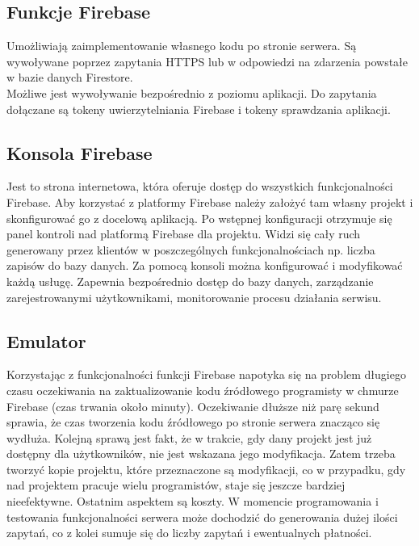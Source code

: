 \subsection{Funkcje Firebase}

Umożliwiają zaimplementowanie własnego kodu po stronie serwera. Są wywoływane poprzez zapytania HTTPS lub w odpowiedzi na zdarzenia powstałe w bazie danych Firestore. \\
Możliwe jest wywoływanie bezpośrednio z poziomu aplikacji. Do zapytania dołączane są tokeny uwierzytelniania Firebase i tokeny sprawdzania aplikacji.

\subsection{Konsola Firebase}

Jest to strona internetowa, która oferuje dostęp do wszystkich funkcjonalności Firebase. Aby korzystać z platformy Firebase należy założyć tam własny projekt i skonfigurować go z docelową aplikacją. Po wstępnej konfiguracji otrzymuje się panel kontroli nad platformą Firebase dla projektu. Widzi się cały ruch generowany przez klientów w poszczególnych funkcjonalnościach np. liczba zapisów do bazy danych. Za pomocą konsoli można konfigurować i modyfikować każdą usługę. Zapewnia bezpośrednio dostęp do bazy danych, zarządzanie zarejestrowanymi użytkownikami, monitorowanie procesu działania serwisu. 

\subsection{Emulator}

Korzystając z funkcjonalności funkcji Firebase napotyka się na problem długiego czasu oczekiwania na zaktualizowanie kodu źródłowego programisty w chmurze Firebase (czas trwania około minuty). Oczekiwanie dłuższe niż parę sekund sprawia, że czas tworzenia kodu źródłowego po stronie serwera znacząco się wydłuża. Kolejną sprawą jest fakt, że w trakcie, gdy dany projekt jest już dostępny dla użytkowników, nie jest wskazana jego modyfikacja. Zatem trzeba tworzyć kopie projektu, które przeznaczone są modyfikacji, co w przypadku, gdy nad projektem pracuje wielu programistów, staje się jeszcze bardziej nieefektywne. Ostatnim aspektem są koszty. W momencie programowania i testowania funkcjonalności serwera może dochodzić do generowania dużej ilości zapytań, co z kolei sumuje się do liczby zapytań i ewentualnych płatności. \\

